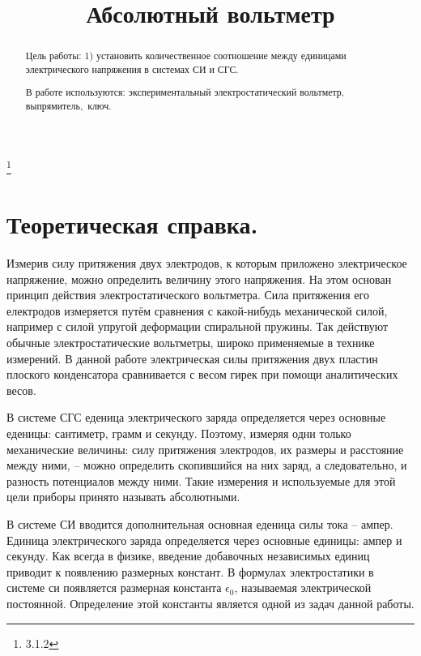 


\title{Абсолютный вольтметр}
\thanks{3.1.2}



\begin{abstract}
Цель работы: 1) установить количественное соотношение между единицами электрического напряжения в системах СИ и СГС.

В работе используются: экспериментальный электростатический вольтметр, выпрямитель,~ключ.

\end{abstract}

\maketitle


\section{\label{sec:level1}Теоретическая справка.}

Измерив силу притяжения двух электродов, к которым приложено электрическое напряжение, можно определить величину этого напряжения. На этом основан принцип действия электростатического вольтметра. Сила притяжения его електродов измеряется путём сравнения с какой-нибудь механической силой, например с силой упругой деформации спиральной пружины. Так действуют обычные электростатические вольтметры, широко применяемые в технике измерений. В данной работе электрическая силы притяжения двух пластин плоского конденсатора сравнивается с весом гирек при помощи аналитических весов.

В системе СГС еденица электрического заряда определяется через основные еденицы: сантиметр, грамм и секунду. Поэтому, измеряя одни только механические величины: силу притяжения электродов, их размеры и расстояние между ними, -- можно определить скопившийся на них заряд, а следовательно, и разность потенциалов между ними. Такие измерения и используемые для этой цели приборы принято называть абсолютными.

В системе СИ вводится дополнительная основная еденица силы тока -- ампер. Единица электрического заряда определяется через основные единицы: ампер и секунду. Как всегда в физике, введение добавочных независимых единиц приводит к появлению размерных констант. В формулах электростатики в системе си появляется размерная константа $\epsilon_0$, называемая электрической постоянной. Определение этой константы является одной из задач данной работы.

